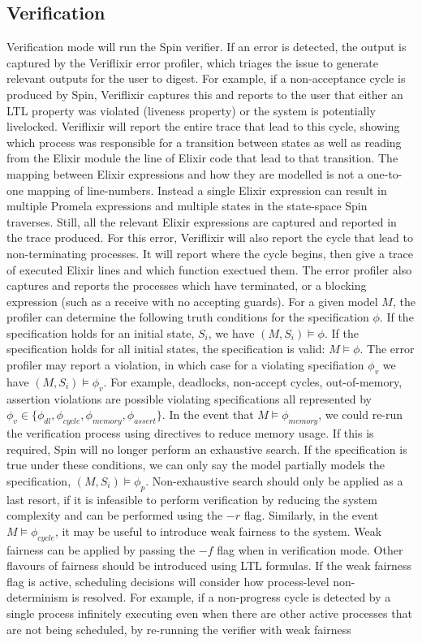 \subsection{Verification}
Verification mode will run the Spin verifier. If an error is detected, the output is captured by the Veriflixir error profiler, which triages the issue to generate relevant outputs for the user to digest. For example, if a non-acceptance cycle is produced by Spin, Veriflixir captures this and reports to the user that either an LTL property was violated (liveness property) or the system is potentially livelocked. Veriflixir will report the entire trace that lead to this cycle, showing which process was responsible for a transition between states as well as reading from the Elixir module the line of Elixir code that lead to that transition. The mapping between Elixir expressions and how they are modelled is not a one-to-one mapping of line-numbers. Instead a single Elixir expression can result in multiple Promela expressions and multiple states in the state-space Spin traverses. Still, all the relevant Elixir expressions are captured and reported in the trace produced. For this error, Veriflixir will also report the cycle that lead to non-terminating processes. It will report where the cycle begins, then give a trace of executed Elixir lines and which function exectued them. The error profiler also captures and reports the processes which have terminated, or a blocking expression (such as a receive with no accepting guards). For a given model $M$, the profiler can determine the following truth conditions for the specification $\phi$. If the specification holds for an initial state, $S_i$, we have $(M, S_i) \models \phi$. If the specification holds for all initial states, the specification is valid: $M \models \phi$. The error profiler may report a violation, in which case for a violating specifiation $\phi _v$ we have $(M, S_i) \models \phi _v$. For example, deadlocks, non-accept cycles, out-of-memory, assertion violations are possible violating specifications all represented by $\phi _v \in \{\phi _{dl}, \phi _{cycle}, \phi _{memory}, \phi _{assert}\}$. In the event that $M \models \phi _{memory}$, we could re-run the verification process using directives to reduce memory usage. If this is required, Spin will no longer perform an exhaustive search. If the specification is true under these conditions, we can only say the model partially models the specification, $(M, S_i) \models \phi _p$. Non-exhaustive search should only be applied as a last resort, if it is infeasible to perform verification by reducing the system complexity and can be performed using the $-r$ flag. Similarly, in the event $M \models \phi _{cycle}$, it may be useful to introduce weak fairness to the system. Weak fairness can be applied by passing the $-f$ flag when in verification mode. Other flavours of fairness should be introduced using LTL formulas. If the weak fairness flag is active, scheduling decisions will consider how process-level non-determinism is resolved. For example, if a non-progress cycle is detected by a single process infinitely executing even when there are other active processes that are not being scheduled, by re-running the verifier with weak fairness 